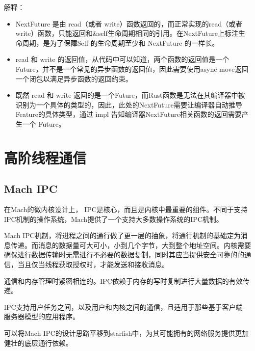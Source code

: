 解释：

\begin{itemize}
    \item NextFuture 是由 read（或者 write）函数返回的，而正常实现的read（或者 write）函数，只能返回和\&self生命周期相同的引用。在NextFuture上标注生命周期，是为了保障Self 的生命周期至少和 NextFuture 的一样长。
    \item read 和 write 的返回值，从代码中可以知道，两个函数的返回值是一个 Future，并不是一个常见的异步函数的返回值，因此需要使用async move返回一个闭包以满足异步函数的返回约束。
    \item 既然 read 和 write 返回的是一个Future，而Rust函数是无法在其编译器中被识别为一个具体的类型的，因此，此处的NextFuture需要让编译器自动推导Feature的具体类型，通过 impl 告知编译器NextFuture相关函数的返回需要产生一个	Future。
\end{itemize}

\section{高阶线程通信}


\subsection{Mach IPC}


在Mach的微内核设计上， IPC是核心，而且是内核中最重要的组件。不同于支持IPC机制的操作系统，Mach提供了一个支持大多数操作系统的IPC机制。

Mach IPC机制，将进程之间的通行做了更一层的抽象，将通行机制的基础定为消息传递。而消息的数据量可大可小，小到几个字节，大到整个地址空间。内核需要确保进行数据传输时无需进行不必要的数据复制，同时其应当提供安全可靠的的通信，当且仅当线程获取授权时，才能发送和接收消息。

通信和内存管理时紧密相连的。IPC依赖于内存的写时复制进行大量数据的有效传递。

IPC支持用户任务之间，以及用户和内核之间的通信，且适用于那些基于客户端-服务器模型的应用程序。

可以将Mach IPC的设计思路平移到starfish中，为其可能拥有的网络服务提供更加健壮的底层通行依赖。